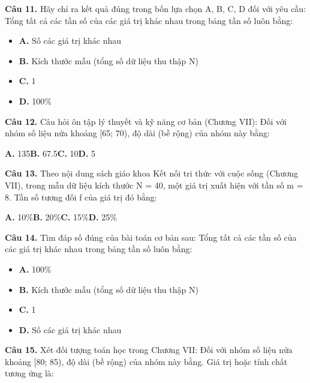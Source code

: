\documentclass[11pt,a4paper]{article}
\begin{document}
\textbf{\color{primary} Câu 11.} Hãy chỉ ra kết quả đúng trong bốn lựa chọn A, B, C, D đối với yêu cầu: Tổng tất cả các tần số của các giá trị khác nhau trong bảng tần số luôn bằng:\par
\begin{itemize}\setlength{\itemsep}{1pt}\setlength{\parskip}{0pt}
  \item[] \textbf{A.} Số các giá trị khác nhau
  \item[] \textbf{B.} Kích thước mẫu (tổng số dữ liệu thu thập N)
  \item[] \textbf{C.} 1
  \item[] \textbf{D.} 100\%
\end{itemize}\vspace{2pt}
\textbf{\color{primary} Câu 12.} Câu hỏi ôn tập lý thuyết và kỹ năng cơ bản (Chương VII): Đối với nhóm số liệu nửa khoảng [65; 70), độ dài (bề rộng) của nhóm này bằng:\par
\hspace*{1.5em}\textbf{A.} 135\quad\quad \textbf{B.} 67.5\quad\quad \textbf{C.} 10\quad\quad \textbf{D.} 5\par\vspace{2pt}
\textbf{\color{primary} Câu 13.} Theo nội dung sách giáo khoa Kết nối tri thức với cuộc sống (Chương VII), trong mẫu dữ liệu kích thước N = 40, một giá trị xuất hiện với tần số m = 8. Tần số tương đối f của giá trị đó bằng:\par
\hspace*{1.5em}\textbf{A.} 10\%\quad\quad \textbf{B.} 20\%\quad\quad \textbf{C.} 15\%\quad\quad \textbf{D.} 25\%\par\vspace{2pt}
\textbf{\color{primary} Câu 14.} Tìm đáp số đúng của bài toán cơ bản sau: Tổng tất cả các tần số của các giá trị khác nhau trong bảng tần số luôn bằng:\par
\begin{itemize}\setlength{\itemsep}{1pt}\setlength{\parskip}{0pt}
  \item[] \textbf{A.} 100\%
  \item[] \textbf{B.} Kích thước mẫu (tổng số dữ liệu thu thập N)
  \item[] \textbf{C.} 1
  \item[] \textbf{D.} Số các giá trị khác nhau
\end{itemize}\vspace{2pt}
\textbf{\color{primary} Câu 15.} Xét đối tượng toán học trong Chương VII: Đối với nhóm số liệu nửa khoảng [80; 85), độ dài (bề rộng) của nhóm này bằng. Giá trị hoặc tính chất tương ứng là:\par
\end{document}
